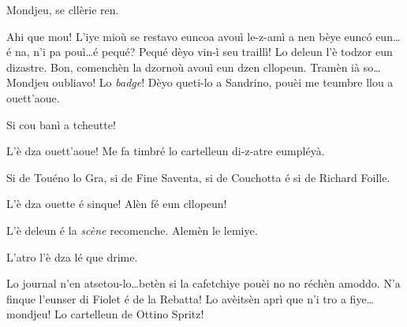 \begin{drama}
\Spritzspeaks{} Mondjeu,  se cllèrie ren. 

\Spritzspeaks Ahi que mou! L’iye mioù se restavo euncoa avouì le-z-amì a nen bèye eunc\'o eun\ldots é na, n'i pa pouì\ldots é pequé? Pequé dèyo vin-ì seu traillì! Lo deleun l’è todzor eun dizastre. Bon, comenchèn la dzornoù avouì eun dzen cllopeun.  Tramèn ià so\ldots  Mondjeu oubliavo! Lo \textit{badge}! Dèyo queti-lo a Sandrino, pouèi me teumbre llou a ouett'aoue.


\Spritzspeaks Si cou banì a tcheutte!




\Thierryspeaks L'è dza ouett'aoue! Me fa timbré lo cartelleun di-z-atre eumpléyà.


\Thierryspeaks Si de Touéno lo Gra, si de Fine Saventa, si de Couchotta é si de Richard Foille.


\Thierryspeaks L'è dza ouette é sinque! Alèn fé eun cllopeun!


\scene[-- L'è deleun]


\Sandrinospeaks L'è deleun é la \textsl{scène} recomenche. Alemèn le lemiye.


\Sandrinospeaks{} L'atro l'è dza lé que drime.


\Sandrinospeaks Lo journal n'en atsetou-lo\ldots betèn si la cafetchiye pouèi no no réchèn amoddo.  N'a finque l'eunser di Fiolet é de la Rebatta! Lo avèitsèn aprì que n'i tro a fiye\ldots mon\-djeu! Lo cartelleun de Ottino Spritz!


\end{drama}
